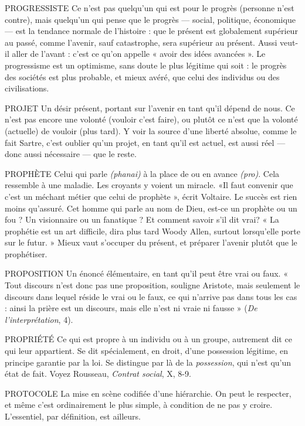 PROGRESSISTE Ce n’est pas quelqu'un qui est pour le progrès (personne
n’est contre), mais quelqu'un qui pense que le progrès —
social, politique, économique — est la tendance normale de l’histoire : que le
présent est globalement supérieur au passé, comme l'avenir, sauf catastrophe,
sera supérieur au présent. Aussi veut-il aller de l’avant : c’est ce qu’on appelle
« avoir des idées avancées ». Le progressisme est un optimisme, sans doute le
plus légitime qui soit : le progrès des sociétés est plus probable, et mieux avéré,
que celui des individus ou des civilisations.

PROJET Un désir présent, portant sur l’avenir en tant qu’il dépend de
nous. Ce n’est pas encore une volonté (vouloir c’est faire), ou
plutôt ce n’est que la volonté (actuelle) de vouloir (plus tard). Y voir la source
d’une liberté absolue, comme le fait Sartre, c’est oublier qu’un projet, en tant
qu'il est actuel, est aussi réel — donc aussi nécessaire — que le reste.

PROPHÈTE Celui qui parle {\it (phanai)} à la place de ou en avance {\it (pro)}. Cela
ressemble à une maladie. Les croyants y voient un miracle.
«Il faut convenir que c’est un méchant métier que celui de prophète », écrit
Voltaire. Le succès est rien moins qu’assuré. Cet homme qui parle au nom de
Dieu, est-ce un prophète ou un fou ? Un visionnaire ou un fanatique ? Et comment
savoir s’il dit vrai? « La prophétie est un art difficile, dira plus tard
Woody Allen, surtout lorsqu'elle porte sur le futur. » Mieux vaut s'occuper du
présent, et préparer l'avenir plutôt que le prophétiser.

PROPOSITION Un énoncé élémentaire, en tant qu’il peut être vrai ou
faux. « Tout discours n’est donc pas une proposition, souligne
Aristote, mais seulement le discours dans lequel réside le vrai ou le faux,
ce qui n'arrive pas dans tous les cas : ainsi la prière est un discours, mais elle
n'est ni vraie ni fausse » ({\it De l'interprétation}, 4).

PROPRIÉTÉ Ce qui est propre à un individu ou à un groupe, autrement dit
ce qui leur appartient. Se dit spécialement, en droit, d’une
possession légitime, en principe garantie par la loi. Se distingue par là de la {\it possession},
qui n’est qu'un état de fait. Voyez Rousseau, {\it Contrat social}, X, 8-9.

PROTOCOLE La mise en scène codifiée d’une hiérarchie. On peut le respecter,
et même c’est ordinairement le plus simple, à condition
de ne pas y croire. L'essentiel, par définition, est ailleurs.

